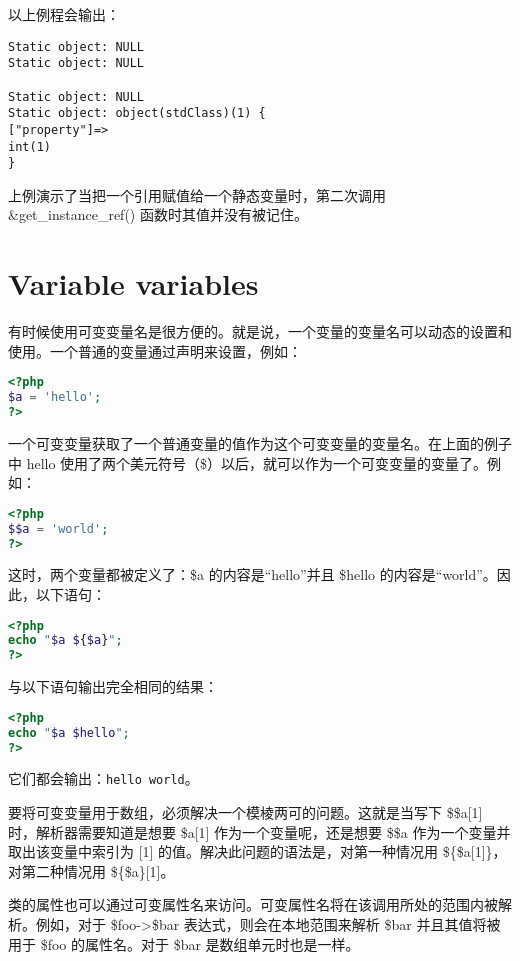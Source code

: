 以上例程会输出：

\begin{verbatim}
Static object: NULL
Static object: NULL

Static object: NULL
Static object: object(stdClass)(1) {
["property"]=>
int(1)
}
\end{verbatim}

上例演示了当把一个引用赋值给一个静态变量时，第二次调用 \&get\_instance\_ref() 函数时其值并没有被记住。

\section{Variable variables}


有时候使用可变变量名是很方便的。就是说，一个变量的变量名可以动态的设置和使用。一个普通的变量通过声明来设置，例如：


\begin{lstlisting}[language=PHP]
<?php
$a = 'hello';
?>
\end{lstlisting}

一个可变变量获取了一个普通变量的值作为这个可变变量的变量名。在上面的例子中 hello 使用了两个美元符号（\$）以后，就可以作为一个可变变量的变量了。例如：


\begin{lstlisting}[language=PHP]
<?php
$$a = 'world';
?>
\end{lstlisting}

这时，两个变量都被定义了：\$a 的内容是“hello”并且 \$hello 的内容是“world”。因此，以下语句：



\begin{lstlisting}[language=PHP]
<?php
echo "$a ${$a}";
?>
\end{lstlisting}

与以下语句输出完全相同的结果：

\begin{lstlisting}[language=PHP]
<?php
echo "$a $hello";
?>
\end{lstlisting}

它们都会输出：\verb|hello world|。



要将可变变量用于数组，必须解决一个模棱两可的问题。这就是当写下 \$\$a[1] 时，解析器需要知道是想要 \$a[1] 作为一个变量呢，还是想要 \$\$a 作为一个变量并取出该变量中索引为 [1] 的值。解决此问题的语法是，对第一种情况用 \$\{\$a[1]\}，对第二种情况用 \$\{\$a\}[1]。

类的属性也可以通过可变属性名来访问。可变属性名将在该调用所处的范围内被解析。例如，对于 \$foo->\$bar 表达式，则会在本地范围来解析 \$bar 并且其值将被用于 \$foo 的属性名。对于 \$bar 是数组单元时也是一样。

